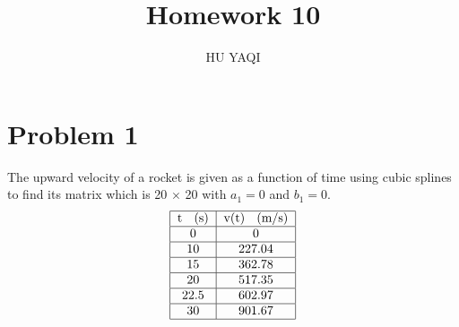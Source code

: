 \documentclass{article}
\title{ Homework 10 }
\author{HU YAQI}
\begin{document}
\maketitle
\setlength{\parindent}{0pt}

\section{ Problem 1 }
The upward velocity of a rocket is given as a function of time using cubic splines to find its matrix which is 20 $\times$ 20 with $a_1=0$ and $b_1=0$.
$$
\centering
\begin{tabular}{| c | c |}\hline
	t \; (s) & v(t) \; (m/s)\\ \hline
	0 & 0\\ \hline
	10 & 227.04\\ \hline 
	15 & 362.78\\ \hline 
	 20 & 517.35\\ \hline
	 22.5 & 602.97\\ \hline
	 30 & 901.67\\ \hline
\end{tabular}
$$
\end{document}
